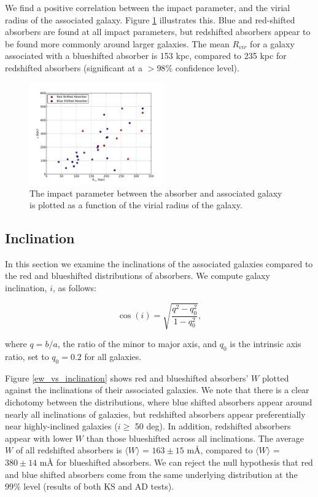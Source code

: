 \documentclass[iop]{emulateapj-rtx4}
\begin{document}
We find a positive correlation between the impact parameter, and the virial radius of the associated galaxy. Figure \ref{impact_virial} illustrates this. Blue and red-shifted absorbers are found at all impact parameters, but redshifted absorbers appear to be found more commonly around larger galaxies. The mean $R_{vir}$ for a galaxy associated with a blueshifted absorber is 153 kpc, compared to 235 kpc for redshifted absorbers (significant at a $>98\%$ confidence level).

\begin{figure}[h!]
        \centering
        \includegraphics[width=0.52\textwidth]{impact(virial).pdf}
        \caption{\small{The impact parameter between the absorber and associated galaxy is plotted as a function of the virial radius of the galaxy.}}
        \label{impact_virial}
        \vspace{2pt}
\end{figure} 


\subsection{Inclination}
In this section we examine the inclinations of the associated galaxies compared to the red and blueshifted distributions of absorbers. We compute galaxy inclination, $i$, as follows:

\begin{equation}
	\cos(i) = \sqrt{\frac{q^2 - q_0^2}{1 - q_0^2}},
\end{equation}

\noindent where $q = b/a$, the ratio of the minor to major axis, and $q_0$ is the intrinsic axis ratio, set to $q_0 = 0.2$ for all galaxies.

Figure \ref{ew_vs_inclination} shows red and blueshifted absorbers' $W$ plotted against the inclinations of their associated galaxies. We note that there is a clear dichotomy between the distributions, where blue shifted absorbers appear around nearly all inclinations of galaxies, but redshifted absorbers appear preferentially near highly-inclined galaxies ($i \geq$ 50 deg). In addition, redshifted absorbers appear with lower $W$ than those blueshifted across all inclinations. The average $W$ of all redshifted absorbers is $\langle W \rangle$ = $163 \pm 15$  $\textrm{m\AA}$, compared to $\langle W \rangle$ = $380 \pm 14$ $\textrm{m\AA}$ for blueshifted absorbers. We can reject the null hypothesis that red and blue shifted absorbers come from the same underlying distribution at the $99\%$ level (results of both KS and AD tests). 
\end{document}
